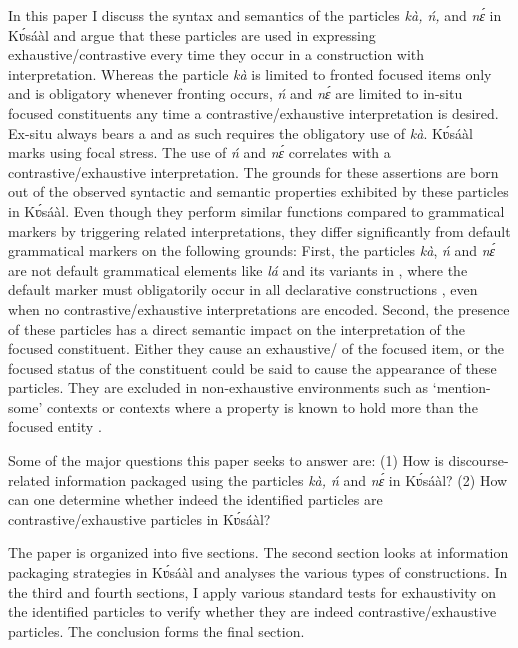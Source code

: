 \documentclass[output=paper
,newtxmath
,modfonts
,nonflat]{langsci/langscibook}
\begin{document}
In this paper I discuss the syntax and semantics of the particles \textit{kà, ń,} and \textit{nɛ́} in Kʋ́sáàl and argue that these particles are used in expressing exhaustive/contrastive  every time they occur in a construction with  interpretation. Whereas the particle \textit{kà} is limited to fronted focused items only and is obligatory whenever fronting occurs, \textit{ń} and \textit{nɛ́} are limited to in-situ focused constituents any time a contrastive/exhaustive  interpretation is desired. Ex-situ  always bears a  and as such requires the obligatory use of \textit{kà}. Kʋ́sáàl marks  using focal stress. The use of \textit{ń} and \textit{nɛ́} correlates with a contrastive/exhaustive  interpretation. The grounds for these assertions are born out of the observed syntactic and semantic properties exhibited by these particles in Kʋ́sáàl. Even though they perform similar functions compared to grammatical  markers by triggering  related interpretations, they differ significantly from default grammatical  markers on the following grounds: First, the particles \textit{kà}, \textit{ń} and \textit{nɛ́} are not default grammatical  elements like \textit{lá} and its variants in , where the default  marker must obligatorily occur in all declarative constructions \citep{Bodomo1997}, even when no contrastive/exhaustive  interpretations are encoded. Second, the presence of these particles has a direct semantic impact on the interpretation of the focused constituent. Either they cause an exhaustive/ of the focused item, or the focused status of the constituent could be said to cause the appearance of these particles. They are excluded in non-exhaustive environments such as ‘mention-some’ contexts or contexts where a property is known to hold more than the focused entity \citep[242]{hartmann2007}. 

Some of the major questions this paper seeks to answer are:
(1) How is discourse-related information packaged using the particles \textit{kà, ń} and \textit{nɛ́} in Kʋ́sáàl? 
(2) How can one determine whether indeed the identified particles are contrastive/exhaustive  particles in Kʋ́sáàl? 

The paper is organized into five sections. The second section looks at information packaging strategies in Kʋ́sáàl and analyses the various types of  constructions. In the third and fourth sections, I apply various standard tests for exhaustivity on the identified  particles to verify whether they are indeed contrastive/exhaustive  particles. The conclusion forms the final section.
\end{document}
